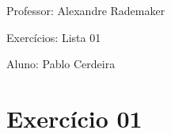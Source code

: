 \documentclass[a4paper,12pt]{article}
\begin{document}
Professor: Alexandre Rademaker

Exercícios: Lista 01

Aluno: Pablo Cerdeira

\section{Exercício 01}
\end{document}
